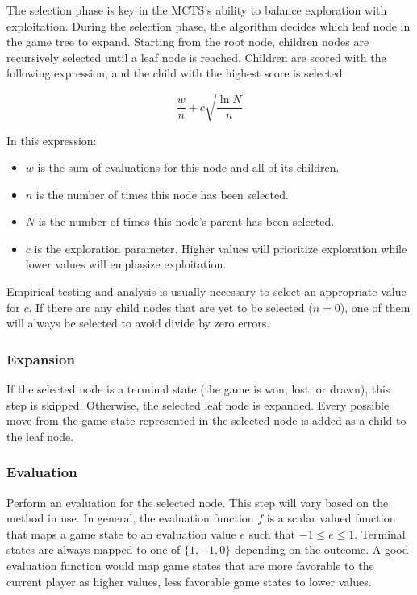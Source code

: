 \documentclass[10pt]{article}
\begin{document}
The selection phase is key in the MCTS's ability to balance exploration with exploitation. During the selection phase, the algorithm decides which leaf node in the game tree to expand. Starting from the root node, children nodes are recursively selected until a leaf node is reached. Children are scored with the following expression, and the child with the highest score is selected.\cite{wikipedia2025mcts}

\begin{equation}
    \frac{w}{n} + c \sqrt{ \frac{\ln N}{n} }
\end{equation}

In this expression:

\begin{itemize}
    \item $w$ is the sum of evaluations for this node and all of its children.
    \item $n$ is the number of times this node has been selected.
    \item $N$ is the number of times this node's parent has been selected. 
    \item $c$ is the exploration parameter. Higher values will prioritize exploration while lower values will emphasize exploitation.
\end{itemize}

Empirical testing and analysis is usually necessary to select an appropriate value for $c$. If there are any child nodes that are yet to be selected ($n = 0$), one of them will always be selected to avoid divide by zero errors.

\subsubsection{Expansion}

If the selected node is a terminal state (the game is won, lost, or drawn), this step is skipped. Otherwise, the selected leaf node is expanded. Every possible move from the game state represented in the selected node is added as a child to the leaf node.

\subsubsection{Evaluation}

Perform an evaluation for the selected node. This step will vary based on the method in use. In general, the evaluation function $f$ is a scalar valued function that maps a game state to an evaluation value $e$ such that $-1 \leq e \leq 1$. Terminal states are always mapped to one of $\{1, -1, 0\}$ depending on the outcome. A good evaluation function would map game states that are more favorable to the current player as higher values, less favorable game states to lower values. 
\end{document}
